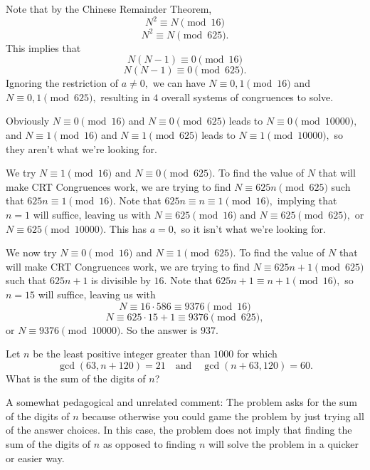 \documentclass{article}
\begin{document}
\begin{sol}
Note that by the Chinese Remainder Theorem,
\[N^2\equiv N\pmod {16}\]
\[N^2\equiv N\pmod{625}.\]
This implies that
\[N(N-1)\equiv 0\pmod{16}\]
\[N(N-1)\equiv 0\pmod{625}.\]
Ignoring the restriction of $a\neq 0,$ we can have $N\equiv 0,1\pmod{16}$ and $N\equiv 0,1\pmod{625},$ resulting in $4$ overall systems of congruences to solve.

Obviously $N\equiv 0\pmod{16}$ and $N\equiv 0\pmod{625}$ leads to $N\equiv 0\pmod{10000},$ and $N\equiv 1\pmod{16}$ and $N\equiv 1\pmod{625}$ leads to $N\equiv 1\pmod{10000},$ so they aren't what we're looking for.

We try $N\equiv 1\pmod{16}$ and $N\equiv 0\pmod{625}.$ To find the value of $N$ that will make CRT Congruences work, we are trying to find $N\equiv 625n\pmod{625}$ such that $625n\equiv 1\pmod{16}.$ Note that $625n\equiv n\equiv 1\pmod{16},$ implying that $n=1$ will suffice, leaving us with $N\equiv 625\pmod{16}$ and $N\equiv 625\pmod{625},$ or $N\equiv 625\pmod{10000}.$ This has $a=0,$ so it isn't what we're looking for.

We now try $N\equiv 0\pmod{16}$ and $N\equiv 1\pmod{625}.$ To find the value of $N$ that will make CRT Congruences work, we are trying to find $N\equiv 625n+1\pmod{625}$ such that $625n+1$ is divisible by $16.$ Note that $625n+1\equiv n+1\pmod{16},$ so $n=15$ will suffice, leaving us with
\[N\equiv 16\cdot 586\equiv 9376\pmod{16}\]
\[N\equiv 625\cdot 15+1\equiv 9376\pmod{625},\]
or $N\equiv 9376\pmod{10000}.$ So the answer is $937.$
\end{sol}

\begin{exam}[AMC 10A 2020/24]
Let $n$ be the least positive integer greater than $1000$ for which\[\gcd(63, n+120) =21\quad \text{and} \quad \gcd(n+63, 120)=60.\]What is the sum of the digits of $n$?
\end{exam}

A somewhat pedagogical and unrelated comment: The problem asks for the sum of the digits of $n$ because otherwise you could game the problem by just trying all of the answer choices. In this case, the problem does not imply that finding the sum of the digits of $n$ as opposed to finding $n$ will solve the problem in a quicker or easier way.
\end{document}
